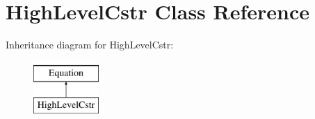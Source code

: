 \hypertarget{class_open_chams_1_1_high_level_cstr}{}\section{High\+Level\+Cstr Class Reference}
\label{class_open_chams_1_1_high_level_cstr}
Inheritance diagram for High\+Level\+Cstr\+:\begin{figure}[H]
\begin{center}
\leavevmode
\includegraphics[height=2.000000cm]{class_open_chams_1_1_high_level_cstr}
\end{center}
\end{figure}
